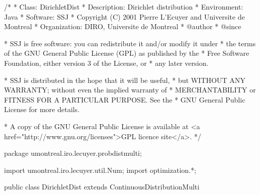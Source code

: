 \begin{code}
\begin{hide}
/*
 * Class:        DirichletDist
 * Description:  Dirichlet distribution
 * Environment:  Java
 * Software:     SSJ 
 * Copyright (C) 2001  Pierre L'Ecuyer and Universite de Montreal
 * Organization: DIRO, Universite de Montreal
 * @author       
 * @since

 * SSJ is free software: you can redistribute it and/or modify it under
 * the terms of the GNU General Public License (GPL) as published by the
 * Free Software Foundation, either version 3 of the License, or
 * any later version.

 * SSJ is distributed in the hope that it will be useful,
 * but WITHOUT ANY WARRANTY; without even the implied warranty of
 * MERCHANTABILITY or FITNESS FOR A PARTICULAR PURPOSE.  See the
 * GNU General Public License for more details.

 * A copy of the GNU General Public License is available at
   <a href="http://www.gnu.org/licenses">GPL licence site</a>.
 */
\end{hide}
package umontreal.iro.lecuyer.probdistmulti;
\begin{hide}
import umontreal.iro.lecuyer.util.Num;
import optimization.*;
\end{hide}

public class DirichletDist extends ContinuousDistributionMulti \begin{hide} {
   private static final double LOGMIN = -709.1;    // Log(MIN_DOUBLE/2)
   protected double[] alpha;

   private static class Optim implements Uncmin_methods
   {
      double[] logP;
      int n;
      int k;

      public Optim (double[] logP, int n) {
         this.n = n;
         this.k = logP.length;
         this.logP = new double[k];
         System.arraycopy (logP, 0, this.logP, 0, k);
      }

      public double f_to_minimize (double[] alpha) {
         double sumAlpha = 0.0;
         double sumLnGammaAlpha = 0.0;
         double sumAlphaLnP = 0.0;

         for (int i = 1; i < alpha.length; i++) {
            if (alpha[i] <= 0.0)
               return 1.0e200;

            sumAlpha += alpha[i];
            sumLnGammaAlpha += Num.lnGamma (alpha[i]);
            sumAlphaLnP += ((alpha[i] - 1.0) * logP[i - 1]);
         }

         return (- n * (Num.lnGamma (sumAlpha) - sumLnGammaAlpha + sumAlphaLnP));
      }

      public void gradient (double[] alpha, double[] g)
      {
      }

      public void hessian (double[] alpha, double[][] h)
      {
      }
   }
\end{hide}
\end{code}
